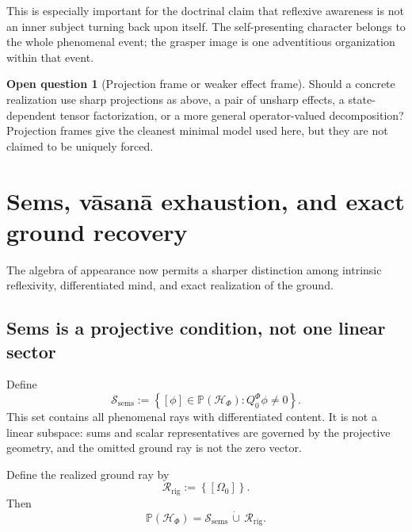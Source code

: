 \documentclass[11pt,reqno]{scrartcl}
\newcommand{\scrHF}{\mathscr H_{\Phi}}
\newcommand{\QzeroF}{Q_{0}^{\Phi}}
\newcommand{\semsSet}{\mathscr S_{\mathrm{sems}}}
\newcommand{\rigRay}{\mathscr R_{\mathrm{rig}}}
\theoremstyle{plain}
\theoremstyle{definition}
\newtheorem{openquestion}[openquestion]{Open question}
\theoremstyle{remark}
\begin{document}
This is especially important for the doctrinal claim that reflexive awareness
is not an inner subject turning back upon itself.  The self-presenting
character belongs to the whole phenomenal event; the grasper image is one
adventitious organization within that event.

\begin{openquestion}[Projection frame or weaker effect frame]
\label{q:projection-or-effect-duality-frame}
Should a concrete realization use sharp projections as above, a pair of
unsharp effects, a state-dependent tensor factorization, or a more general
operator-valued decomposition?  Projection frames give the cleanest minimal
model used here, but they are not claimed to be uniquely forced.
\end{openquestion}
\section{Sems, v\=asan\=a exhaustion, and exact ground recovery}
\label{sec:sems-exhaustion-ground-recovery}

The algebra of appearance now permits a sharper distinction among intrinsic
reflexivity, differentiated mind, and exact realization of the ground.

\subsection{Sems is a projective condition, not one linear sector}

Define
\begin{equation}
  \boxed{
  \semsSet
  :=\left\{
      [\phi]\in\mathbb P(\scrHF):
      \QzeroF\phi\neq0
    \right\}.}
  \label{eq:sems-projective-set}
\end{equation}
This set contains all phenomenal rays with differentiated content.  It is not
a linear subspace: sums and scalar representatives are governed by the
projective geometry, and the omitted ground ray is not the zero vector.

Define the realized ground ray by
\begin{equation}
  \boxed{
  \rigRay:=\left\{[\Omega_0]\right\}.}
  \label{eq:rigpa-ground-ray-set}
\end{equation}
Then
\begin{equation}
  \mathbb P(\scrHF)
  =\semsSet\,\dot\cup\,\rigRay.
  \label{eq:projective-sems-rigpa-partition}
\end{equation}
\end{document}
